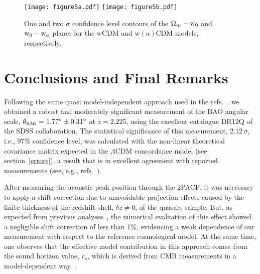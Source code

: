 \documentclass[a4paper,11pt]{article}
\begin{document}
\begin{figure}[h!]
\hspace{-0.2cm}
\texttt{[image: figure5a.pdf]}
\hspace{-1cm}
\texttt{[image: figure5b.pdf]}
\caption{One and two $\sigma$ confidence level contours of the $\Omega_m-{\mbox w}_0$ and ${\mbox w}_0-{\mbox w}_a$ 
planes for the wCDM and w$(a)$CDM models, respectively.} 
\label{contours}
\end{figure}


\section{\label{sec5} Conclusions and Final Remarks} 

Following the same quasi model-independent approach used in the 
refs.~\cite{Carvalho,Alcaniz,Gabriela2,Carnero,Sanchez11}, we obtained a robust and moderately 
significant measurement of the BAO angular scale, 
$\theta_{\mbox{\footnotesize\sc bao}} = 1.77^{\circ} \pm 0.31^{\circ}$ at $\overline{z}=2.225$, 
using the excellent catalogue DR12Q of the SDSS collaboration. 
The statistical significance of this measurement, $2.12 \,\sigma$, i.e., 97\% confidence level, was 
calculated with the non-linear theoretical covariance matrix expected in the $\Lambda$CDM 
concordance model (see section~\ref{errors}), a result that is in excellent agreement with reported 
measurements (see, e.g., refs.~\cite{Carnero,Crocce11b}). 


After measuring the acoustic peak position through the 2PACF, it was necessary to apply a shift 
correction due to unavoidable projection effects caused by the finite thickness of the redshift shell, 
$\delta z \ne 0$, of the quasars sample. 
But, as expected from previous analyses~\cite{Sanchez11}, the numerical evaluation of this effect 
showed a negligible shift correction of less than 1\%, evidencing a weak dependence of our 
measurement with respect to the reference cosmological model. 
At the same time, one observes that the effective model contribution in this approach comes 
from the sound horizon value, $r_s$, which is derived from CMB measurements in a 
model-dependent way~\cite{wmap9}. 
\end{document}

